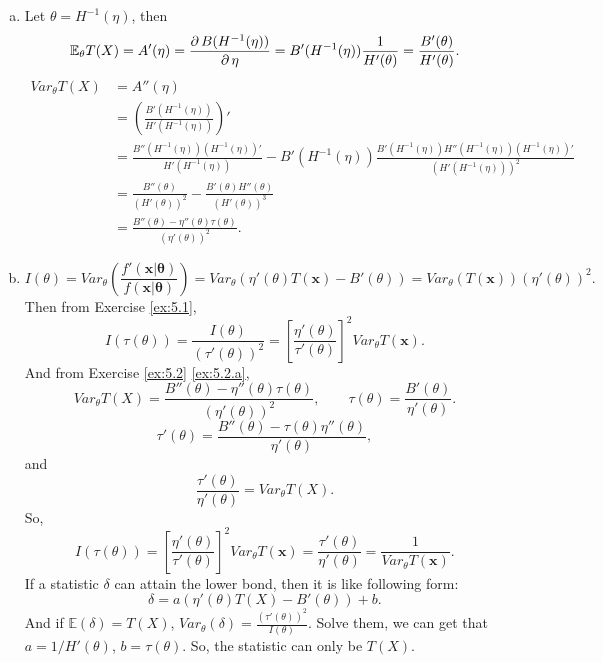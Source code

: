 \begin{solution}
    \begin{enumerate}[(a)]
        \item \label{ex:5.2.a} Let $\theta=H^{-1}(\eta)$, then 
        \[
            \mathbb{E}_\theta T(X) = A'(\eta) =\frac{\partial\, B(H^{-1}(\eta))}{\partial\, \eta}=B'(H^{-1}(\eta))\frac{1}{H'(\theta)}=\frac{B'(\theta)}{H'(\theta)}. 
        \]
        \[
            \begin{aligned}
                Var_\theta T(X)&=A''(\eta)\\
                &=\left(\frac{B'(H^{-1}(\eta))}{H'(H^{-1}(\eta))}\right)'\\
                &=\frac{B''(H^{-1}(\eta))(H^{-1}(\eta))'}{H'(H^{-1}(\eta))}-B'(H^{-1}(\eta))\frac{B'(H^{-1}(\eta))H''(H^{-1}(\eta))(H^{-1}(\eta))'}{\left(H'(H^{-1}(\eta))\right)^2}\\
                &=\frac{B''(\theta)}{(H'(\theta))^2}-\frac{B'(\theta)H''(\theta)}{(H'(\theta))^3}\\
                &=\frac{B''(\theta)-\eta''(\theta)\tau(\theta)}{(\eta'(\theta))^2}. 
            \end{aligned}
        \]
        \item \[
            I(\theta)=Var_\theta\left(\frac{f'(\mathbf{x|\theta})}{f(\mathbf{x|\theta})}\right)=Var_{\theta}(\eta'(\theta)T(\mathbf{x})-B'(\theta))=Var_\theta(T(\mathbf{x}))(\eta'(\theta))^2. 
        \]
        Then from Exercise \ref{ex:5.1}, 
        \begin{equation}
            I(\tau(\theta))=\frac{I(\theta)}{(\tau'(\theta))^2}=\left[\frac{\eta'(\theta)}{\tau'(\theta)}\right]^2Var_\theta T(\mathbf{x}). 
            \label{eq:5.2.1}
        \end{equation}
        And from Exercise \ref{ex:5.2} \ref{ex:5.2.a},
        \[
            Var_\theta T(X)=\frac{B''(\theta)-\eta''(\theta)\tau(\theta)}{(\eta'(\theta))^2}, \qquad \tau(\theta)=\frac{B'(\theta)}{\eta'(\theta)}. 
        \]
        \[
            \tau'(\theta)=\frac{B''(\theta)-\tau(\theta)\eta''(\theta)}{\eta'(\theta)}, 
        \]
        and \[
            \frac{\tau'(\theta)}{\eta'(\theta)}=Var_\theta T(X).
        \]
        So, 
        \[
            I(\tau(\theta))=\left[\frac{\eta'(\theta)}{\tau'(\theta)}\right]^2Var_\theta T(\mathbf{x})=\frac{\tau'(\theta)}{\eta'(\theta)}=\frac{1}{Var_\theta T(\mathbf{x})}. 
        \]
        If a statistic $\delta$ can attain the lower bond, then it is like following form: 
        \[
           \delta=a\left(\eta'(\theta)T(X)-B'(\theta)\right)+b.
        \]
        And if $\mathbb{E}(\delta)=T(X)$, $Var_\theta(\delta)=\frac{(\tau'(\theta))^2}{I(\theta)}$. Solve them, we can get that $a=1/H'(\theta)$, $b=\tau(\theta)$. So, the statistic can only be $T(X)$. 
    \end{enumerate}
\end{solution}

